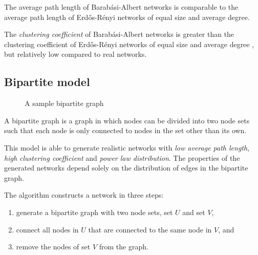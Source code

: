 \documentclass[a4paper,11pt,titlepage]{article}
\begin{document}

The average path length of Barab\'{a}si-Albert networks is comparable to the
average path length of Erd\H{o}s-R\'{e}nyi networks of equal size and average
degree.

The \emph{clustering coefficient} of Barab\'{a}si-Albert networks is greater
than the clustering coefficient of Erd\H{o}s-R\'{e}nyi networks of equal size
and average degree \cite{oconn11}, but relatively low compared to real networks.


\subsection{Bipartite model}

\begin{figure}[ht!]
  \centering
  
  \caption{A sample bipartite graph}
\end{figure}

A bipartite graph is a graph in which nodes can be divided into two
node sets such that each node is only connected to nodes in the set
other than its own.

This model is able to generate realistic networks with \emph{low
  average path length}, \emph{high clustering coefficient} and
\emph{power law distribution}. The properties of the generated
networks depend solely on the distribution of edges in the bipartite
graph.

\noindent The algorithm constructs a network in three steps:
\begin{enumerate}
  \item generate a bipartite graph with two node sets, set $U$ and set
    $V$,
  \item connect all nodes in $U$ that are connected to the same node
    in $V$, and
  \item remove the nodes of set $V$ from the graph.
\end{enumerate}
\end{document}

